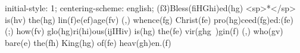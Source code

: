 initial-style: 1;
centering-scheme: english;
(f3)Bless(fiHGhi)ed(hg) <sp>*</sp> is(hv) the(hg) lin(f)e(ef)age(fv) (,) whence(fg) Christ(fe) pro(hg)ceed(fg)ed:(fe) (;) how(fv) glo(hg)ri(hi)ous(ijIHiv) is(hg) the(fe) vir(ghg~)gin(f) (,) who(gv) bare(e) the(fh) King(hg) of(fe) heav(gh)en.(f)
